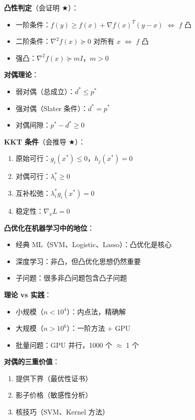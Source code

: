 \documentclass[12pt, a4paper]{ctexart}
\begin{document}
\begin{keypoint}[数学定理总结]

\textbf{凸性判定}（会证明 $\bigstar$）：
\begin{itemize}
    \item 一阶条件：$f(y) \geq f(x) + \nabla f(x)^T(y-x)$ $\Leftrightarrow$ $f$ 凸
    \item 二阶条件：$\nabla^2 f(x) \succeq 0$ 对所有 $x$ $\Leftrightarrow$ $f$ 凸
    \item 强凸：$\nabla^2 f(x) \succeq mI$，$m > 0$
\end{itemize}

\textbf{对偶理论}：
\begin{itemize}
    \item 弱对偶（总成立）：$d^* \leq p^*$
    \item 强对偶（Slater 条件）：$d^* = p^*$
    \item 对偶间隙：$p^* - d^* \geq 0$
\end{itemize}

\textbf{KKT 条件}（会推导 $\bigstar$）：
\begin{enumerate}
    \item 原始可行：$g_i(x^*) \leq 0$，$h_j(x^*) = 0$
    \item 对偶可行：$\lambda_i^* \geq 0$
    \item 互补松弛：$\lambda_i^* g_i(x^*) = 0$
    \item 稳定性：$\nabla_x L = 0$
\end{enumerate}

\end{keypoint}

\begin{keypoint}[现代视角]

\textbf{凸优化在机器学习中的地位}：
\begin{itemize}
    \item 经典 ML（SVM、Logistic、Lasso）：凸优化是核心
    \item 深度学习：非凸，但凸优化思想仍然重要
    \item 子问题：很多非凸问题包含凸子问题
\end{itemize}

\textbf{理论 vs 实践}：
\begin{itemize}
    \item 小规模（$n < 10^4$）：内点法，精确解
    \item 大规模（$n > 10^6$）：一阶方法 + GPU
    \item 批量问题：GPU 并行，1000 个 $\approx$ 1 个
\end{itemize}

\textbf{对偶的三重价值}：
\begin{enumerate}
    \item 提供下界（最优性证书）
    \item 影子价格（敏感性分析）
    \item 核技巧（SVM、Kernel 方法）
\end{enumerate}

\end{keypoint}
\end{document}
